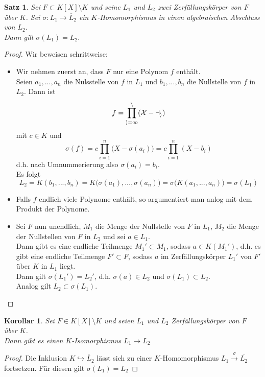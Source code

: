 \documentclass[10pt,a4paper]{article}
\newcommand{\ol}[1]{\overline{#1}}
\theoremstyle{plain}
\newtheorem{kor}[theorem]{Korollar}
\newtheorem{satz}[theorem]{Satz}
\theoremstyle{definition}
\theoremstyle{remark}
\begin{document}
	\begin{satz}\label{satz:abbZFK}
		Sei $F\subset K[X]\setminus K$ und seine $L_1$ und $L_2$ zwei Zerfällungskörper von $F$ über $K$.
		Sei $\sigma:L_1\to\ol L_2$ ein $K$-Homomorphismus in einen algebraischen Abschluss von $L_2$.\\
		Dann gilt $\sigma(L_1)=L_2$.
	\end{satz}
	\begin{proof}
		Wir beweisen schrittweise:
		\begin{itemize}
			\item Wir nehmen zuerst an, dass $F$ nur eine Polynom $f$ enthält.\\
			Seien $a_1,...,a_n$ die Nulsstelle von $f$ in $L_1$ und $b_1,...,b_n$ die Nullstelle von $f$ in $L_2$. Dann ist
			\[f=\cal\prod_{i=1}^{n}(X-a_i)\]
			mit $c\in K$ und
			\[\sigma(f)=c\prod_{i=1}^{n}\big(X-\sigma(a_i)\big)=c\prod_{i=1}^n(X-b_i)\]
			d.h. nach Umnummerierung also $\sigma(a_i)=b_i$.\\
			Es folgt
			\[L_2=K(b_1,...,b_n)=K\big(\sigma(a_1),...,\sigma(a_n)\big)=\sigma\big(K(a_1,...,a_n)\big)=\sigma(L_1)\]
			\item Falls $f$ endlich viele Polynome enthält, so argumentiert man anlog mit dem Produkt der Polynome.
			\item Sei $F$ nun unendlich, $M_1$ die Menge der Nullstelle von $F$ in $L_1$, $M_2$ die Menge der Nullstellen von $F$ in $L_2$ und sei $a\in L_1$.\\
			Dann gibt es eine endliche Teilmenge $M_1'\subset M_1$, sodass $a\in K(M_1')$, d.h. es gibt eine endliche Teilmenge $F'\subset F$, sodass $a$ im Zerfällungskörper $L_1'$ von $F'$ über $K$ in $L_1$ liegt.\\
			Dann gilt $\sigma(L_1')=L_2'$, d.h. $\sigma(a)\in L_2$ und $\sigma(L_1)\subset L_2$.\\
			Analog gilt $L_2\subset\sigma(L_1)$.
		\end{itemize}
	\end{proof}

	\begin{kor}
		Sei $F\in K[X]\setminus K$ und seien $L_1$ und $L_2$ Zerfällungskörper von $F$ über $K$.\\
		Dann gibt es einen $K$-Isomorphismus $L_1\to L_2$
	\end{kor}
	\begin{proof}
		Die Inklusion $K\hookrightarrow \ol L_2$ lässt sich zu einer $K$-Homomorphismus $L_1\xrightarrow{\sigma} \ol{L_2}$ fortsetzen. Für diesen gilt $\sigma(L_1)=L_2$
	\end{proof}
\end{document}
